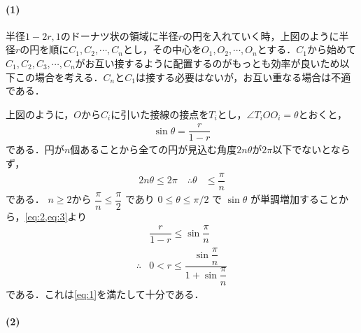 \documentclass[../../main.tex]{subfiles}
\begin{document}
\paragraph{(1)}

半径$1-2r,1$のドーナツ状の領域に半径$r$の円を入れていく時，上図のように半径$r$の円を順に$C_1, C_2, \cdots, C_n$とし，その中心を$O_1, O_2, \cdots, O_n$とする．$C_1$から始めて$C_1, C_2,C_3,\cdots, C_n$がお互い接するように配置するのがもっとも効率が良いため以下この場合を考える．$C_n$と$C_1$は接する必要はないが，お互い重なる場合は不適である．

上図のように，$O$から$C_i$に引いた接線の接点を$T_i$とし，$\angle T_iOO_i=\theta$とおくと，
\begin{align}
  \sin \theta = \dfrac{r}{1-r} \label{eq:2}
\end{align}
である．円が$n$個あることから全ての円が見込む角度$2n\theta$が$2\pi$以下でないとならず，
\begin{align}
  2n\theta \le 2\pi
  \quad\therefore
  \theta &\le \dfrac{\pi}{n} \label{eq:3}
\end{align}
である．
$n \ge 2$から $\dfrac{\pi}{n} \le \dfrac{\pi}{2}$ であり $0 \le \theta \le \pi/2$ で $\sin \theta$ が単調増加することから，\cref{eq:2,eq:3}より
\begin{align}
  & \dfrac{r}{1-r} \le \sin \dfrac{\pi}{n} \\
  \therefore
  & 0 < r \le \dfrac{\sin \dfrac{\pi}{n}}{1+\sin \dfrac{\pi}{n}} \label{eq:4}
\end{align}
である．これは\cref{eq:1}を満たして十分である．

\paragraph{(2)}
\end{document}
